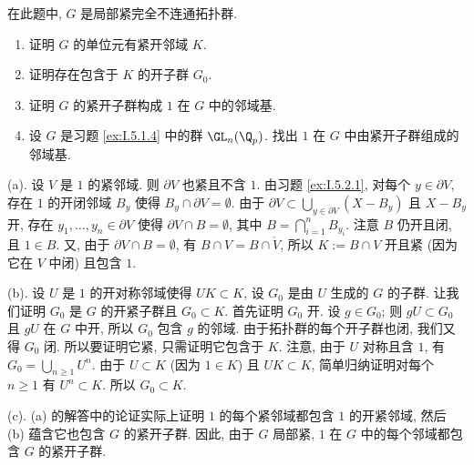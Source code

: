 \begin{exercise}[局部紧完全不连通群的紧开子群]
\label{ex:I.5.2.2}
在此题中, $G$ 是局部紧完全不连通拓扑群.
\begin{enumerate}
\item[(a)] 证明 $G$ 的单位元有紧开邻域 $K$.
\item[(b)] 证明存在包含于 $K$ 的开子群 $G_0$.
\item[(c)] 证明 $G$ 的紧开子群构成 $1$ 在 $G$ 中的邻域基.
\item[(d)] 设 $G$ 是习题 \ref{ex:I.5.1.4} 中的群 $\GL_n(\Q_p)$. 找出 $1$ 在 $G$ 中由紧开子群组成的邻域基.
\end{enumerate}
\end{exercise}

\begin{solution}
(a). 设 $V$ 是 $1$ 的紧邻域. 则 $\partial V$ 也紧且不含 $1$. 由习题 \ref{ex:I.5.2.1}, 对每个 $y \in \partial V$, 存在 $1$ 的开闭邻域 $B_y$ 使得 $B_y \cap \partial V = \emptyset$. 由于 $\partial V \subset \bigcup_{y \in \partial V}(X - B_y)$ 且 $X - B_y$ 开, 存在 $y_1, \ldots, y_n \in \partial V$ 使得 $\partial V \cap B = \emptyset$, 其中 $B = \bigcap_{i=1}^n B_{y_i}$. 注意 $B$ 仍开且闭, 且 $1 \in B$. 又, 由于 $\partial V \cap B = \emptyset$, 有 $B \cap V = B \cap \mathring{V}$, 所以 $K := B \cap V$ 开且紧 (因为它在 $V$ 中闭) 且包含 $1$.

(b). 设 $U$ 是 $1$ 的开对称邻域使得 $UK \subset K$, 设 $G_0$ 是由 $U$ 生成的 $G$ 的子群. 让我们证明 $G_0$ 是 $G$ 的开紧子群且 $G_0 \subset K$. 首先证明 $G_0$ 开. 设 $g \in G_0$; 则 $gU \subset G_0$ 且 $gU$ 在 $G$ 中开, 所以 $G_0$ 包含 $g$ 的邻域. 由于拓扑群的每个开子群也闭, 我们又得 $G_0$ 闭. 所以要证明它紧, 只需证明它包含于 $K$. 注意, 由于 $U$ 对称且含 $1$, 有 $G_0 = \bigcup_{n \geq 1}U^n$. 由于 $U \subset K$ (因为 $1 \in K$) 且 $UK \subset K$, 简单归纳证明对每个 $n \geq 1$ 有 $U^n \subset K$. 所以 $G_0 \subset K$.

(c). (a) 的解答中的论证实际上证明 $1$ 的每个紧邻域都包含 $1$ 的开紧邻域, 然后 (b) 蕴含它也包含 $G$ 的紧开子群. 因此, 由于 $G$ 局部紧, $1$ 在 $G$ 中的每个邻域都包含 $G$ 的紧开子群.


\end{solution}
